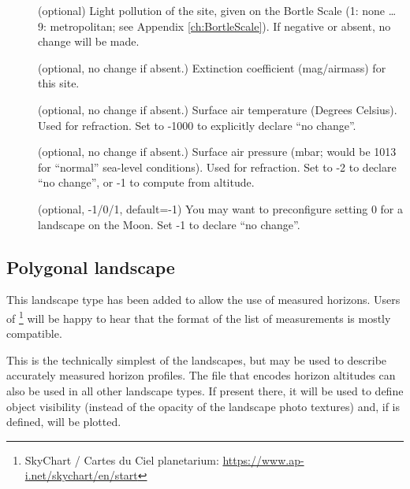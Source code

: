\begin{description}
\item[] (optional) Light pollution of the site,
  given on the Bortle Scale (1: none \ldots 9: metropolitan; see
  Appendix \ref{ch:BortleScale}). If negative or absent, no change
  will be made.
\item[] (optional, no change
  if absent.) Extinction coefficient (mag/airmass) for this site.
\item[] (optional, no change if absent.)
  Surface air temperature (Degrees Celsius). Used for refraction. Set
  to -1000 to explicitly declare ``no change''.
\item[] (optional, no change if absent.)
  Surface air pressure (mbar; would be 1013 for ``normal'' sea-level
  conditions). Used for refraction. Set to -2 to declare ``no change'',
  or -1 to compute from altitude.
\item[] (optional, -1/0/1, default=-1) You may want
  to preconfigure setting 0 for a landscape on the Moon. Set -1 to
  declare ``no change''.
\end{description}


\subsection{Polygonal landscape}
\label{sec:landscapes:Polygonal}

This landscape type has been added to allow
the use of measured horizons. Users of \footnote{SkyChart / Cartes du Ciel planetarium:
  \url{https://www.ap-i.net/skychart/en/start}} will be happy to hear
that the format of the list of measurements is mostly compatible.

This is the technically simplest of the landscapes, but may be used to
describe accurately measured horizon profiles. The file that encodes
horizon altitudes can also be used in all other landscape types. If
present there, it will be used to define object visibility (instead of
the opacity of the landscape photo textures) and, if
 is defined, will be plotted.

